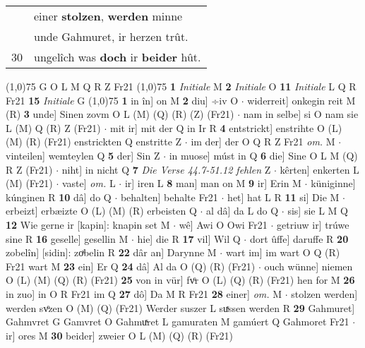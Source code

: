\documentclass[8pt,a4paper,notitlepage]{article}
\begin{document}
\begin{table}[ht]
\begin{minipage}[t]{0.5\linewidth}
\begin{tabular}{rl}
 & einer \textbf{stolzen}, \textbf{werden} minne\\ 
 & unde Gahmuret, ir herzen trût.\\ 
30 & ungelîch was \textbf{doch} ir \textbf{beider} hût.\\ 
\end{tabular}
\scriptsize
\line(1,0){75} \newline
G O L M Q R Z Fr21 \newline
\line(1,0){75} \newline
\textbf{1} \textit{Initiale} M  \textbf{2} \textit{Initiale} O  \textbf{11} \textit{Initiale} L Q R Fr21  \textbf{15} \textit{Initiale} G  \newline
\line(1,0){75} \newline
\textbf{1} in în] on M \textbf{2} diu] ÷iv O  $\cdot$ widerreit] onkegin reit M (R) \textbf{3} unde] Sinen zovm O L (M) (Q) (R) (Z) (Fr21)  $\cdot$ nam in selbe] si O nam sie L (M) Q (R) Z (Fr21)  $\cdot$ mit ir] mit der Q in Ir R \textbf{4} entstrickt] enstrihte O (L) (M) (R) (Fr21) enstrickten Q enstritte Z  $\cdot$ im der] der O Q R Z Fr21 \textit{om.} M  $\cdot$ vinteilen] wemteylen Q \textbf{5} der] Sin Z  $\cdot$ in muose] múst in Q \textbf{6} die] Sine O L M (Q) R Z (Fr21)  $\cdot$ niht] in nicht Q \textbf{7} \textit{Die Verse 44.7-51.12 fehlen} Z   $\cdot$ kêrten] enkerten L (M) (Fr21)  $\cdot$ vaste] \textit{om.} L  $\cdot$ ir] iren L \textbf{8} man] man on M \textbf{9} ir] Erin M  $\cdot$ küniginne] kúnginen R \textbf{10} dâ] do Q  $\cdot$ behalten] behalte Fr21  $\cdot$ het] hat L R \textbf{11} si] Die M  $\cdot$ erbeizt] erbæizte O (L) (M) (R) erbeisten Q  $\cdot$ al dâ] da L do Q  $\cdot$ sis] sie L M Q \textbf{12} Wie gerne ir [kapin]: knapin set M  $\cdot$ wê] Awi O Owi Fr21  $\cdot$ getriuw ir] trúwe sine R \textbf{16} geselle] gesellin M  $\cdot$ hie] die R \textbf{17} vil] Wil Q  $\cdot$ dort ûffe] daruffe R \textbf{20} zobelîn] [sidin]: zoͯbelin R \textbf{22} dâr an] Darynne M  $\cdot$ wart im] im wart O Q (R) Fr21 wart M \textbf{23} ein] Er Q \textbf{24} dâ] Al da O (Q) (R) (Fr21)  $\cdot$ ouch wünne] niemen O (L) (M) (Q) (R) (Fr21) \textbf{25} von in vür] fvͦr O (L) (Q) (R) (Fr21) hen for M \textbf{26} in zuo] in O R Fr21 im Q \textbf{27} dô] Da M R Fr21 \textbf{28} einer] \textit{om.} M  $\cdot$ stolzen werden] werden svͦzen O (M) (Q) (Fr21) Werder suszer L suͯssen werden R \textbf{29} Gahmuret] Gahmvret G Gamvret O Gahmuͯret L gamuraten M gamúert Q Gahmoret Fr21  $\cdot$ ir] ores M \textbf{30} beider] zweier O L (M) (Q) (R) (Fr21) \newline

\end{minipage}
\end{table}
\end{document}
